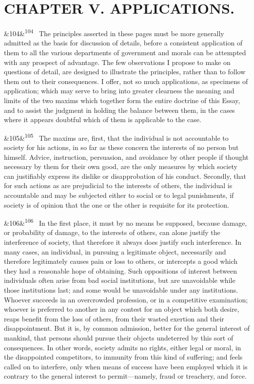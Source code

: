 \documentclass[12pt]{article}
\newcommand{\para}[1][]{\par\noindent\ifx&#1&\else\textsuperscript{\footnotesize #1}~\fi}
\begin{document}
\section*{CHAPTER V. APPLICATIONS.}

\para[104] The principles asserted in these pages must be more generally admitted as the basis for discussion of details, before a consistent application of them to all the various departments of government and morals can be attempted with any prospect of advantage. The few observations I propose to make on questions of detail, are designed to illustrate the principles, rather than to follow them out to their consequences. I offer, not so much applications, as specimens of application; which may serve to bring into greater clearness the meaning and limits of the two maxims which together form the entire doctrine of this Essay, and to assist the judgment in holding the balance between them, in the cases where it appears doubtful which of them is applicable to the case.

\para[105] The maxims are, first, that the individual is not accountable to society for his actions, in so far as these concern the interests of no person but himself. Advice, instruction, persuasion, and avoidance by other people if thought necessary by them for their own good, are the only measures by which society can justifiably express its dislike or disapprobation of his conduct. Secondly, that for such actions as are prejudicial to the interests of others, the individual is accountable and may be subjected either to social or to legal punishments, if society is of opinion that the one or the other is requisite for its protection.

\para[106] In the first place, it must by no means be supposed, because damage, or probability of damage, to the interests of others, can alone justify the interference of society, that therefore it always does justify such interference. In many cases, an individual, in pursuing a legitimate object, necessarily and therefore legitimately causes pain or loss to others, or intercepts a good which they had a reasonable hope of obtaining. Such oppositions of interest between individuals often arise from bad social institutions, but are unavoidable while those institutions last; and some would be unavoidable under any institutions. Whoever succeeds in an overcrowded profession, or in a competitive examination; whoever is preferred to another in any contest for an object which both desire, reaps benefit from the loss of others, from their wasted exertion and their disappointment. But it is, by common admission, better for the general interest of mankind, that persons should pursue their objects undeterred by this sort of consequences. In other words, society admits no rights, either legal or moral, in the disappointed competitors, to immunity from this kind of suffering; and feels called on to interfere, only when means of success have been employed which it is contrary to the general interest to permit---namely, fraud or treachery, and force.
\end{document}

